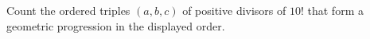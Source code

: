 Count the ordered triples $(a,b,c)$ of positive divisors of $10!$ that form a geometric progression in the displayed order.
